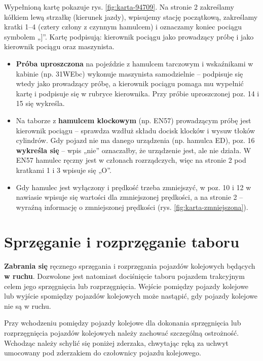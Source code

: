 Wypełnioną kartę pokazuje rys. \ref{fig:karta-94709}. Na stronie 2 zakreślamy kółkiem lewą strzałkę (kierunek jazdy), wpisujemy stację początkową, zakreślamy kratki 1–4 (cztery człony z czynnym hamulcem) i oznaczamy koniec pociągu symbolem „]”. Kartę podpisują: kierownik pociągu jako prowadzący próbę i jako kierownik pociągu oraz maszynista.

\begin{tcolorbox}[colback=yellow!10!white,colframe=orange!80!black,title=Na co zwrócić uwagę]
	\begin{itemize}
		\item \textbf{Próba uproszczona} na pojeździe z hamulcem tarczowym i wskaźnikami w kabinie (np. 31WEbc) wykonuje maszynista samodzielnie – podpisuje się wtedy jako prowadzący próbę, a kierownik pociągu pomaga mu wypełnić kartę i podpisuje się w rubryce kierownika. Przy próbie uproszczonej poz. 14 i 15 się wykreśla.
		\item Na taborze z \textbf{hamulcem klockowym} (np. EN57) prowadzącym próbę jest kierownik pociągu – sprawdza wzdłuż składu docisk klocków i wysuw tłoków cylindrów. Gdy pojazd nie ma danego urządzenia (np. hamulca ED), poz. 16 \textbf{wykreśla się} – wpis „nie” oznaczałby, że urządzenie jest, ale nie działa. W EN57 hamulec ręczny jest w członach rozrządczych, więc na stronie 2 pod kratkami 1 i 3 wpisuje się „O”.
		\item Gdy hamulec jest wyłączony i prędkość trzeba zmniejszyć, w poz. 10 i 12 w nawiasie wpisuje się wartości dla zmniejszonej prędkości, a na stronie 2 – wyraźną informację o zmniejszonej prędkości (rys. \ref{fig:karta-zmniejszona}).
	\end{itemize}
\end{tcolorbox}

\chapter{Sprzęganie i rozprzęganie taboru}
\label{ch:sprzeganie}

\textbf{Zabrania się} ręcznego sprzęgania i rozprzęgania pojazdów kolejowych będących \textbf{w ruchu}. Dozwolone jest natomiast dociśnięcie taboru pojazdem trakcyjnym celem jego sprzęgnięcia lub rozprzęgnięcia. Wejście pomiędzy pojazdy kolejowe lub wyjście spomiędzy pojazdów kolejowych może nastąpić, gdy pojazdy kolejowe nie są w ruchu. 

Przy wchodzeniu pomiędzy pojazdy kolejowe dla dokonania sprzęgnięcia lub rozprzęgnięcia pojazdów kolejowych należy zachować szczególną ostrożność. Wchodząc należy schylić się poniżej zderzaka, chwytając ręką za uchwyt umocowany pod zderzakiem do czołownicy pojazdu kolejowego. 

